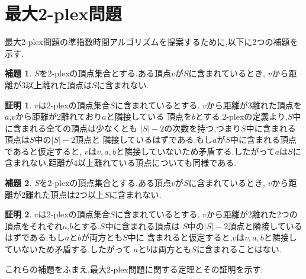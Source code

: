 \documentclass{thesis}
\theoremstyle{definition}
\newtheorem{lemma}{補題}[chapter]
\newtheorem*{prf*}{証明}
\begin{document}
\section{最大2-plex問題} \label{section:2plex}
最大2-plex問題の準指数時間アルゴリズムを提案するために,以下に2つの補題を示す.
\begin{lemma} \label{lemma:1}
$S$を2-plexの頂点集合とする.ある頂点$v$が$S$に含まれているとき,
$v$から距離が3以上離れた頂点は$S$に含まれない.
\begin{prf*}
$v$は2-plexの頂点集合$S$に含まれているとする.
$v$から距離が3離れた頂点を$a$,$v$から距離が2離れており$a$と隣接している
頂点を$b$とする.2-plexの定義より,$S$中に含まれる全ての頂点は少なくとも
$|S| - 2$の次数を持つ,つまり$S$中に含まれる頂点は$S$中の$|S| - 2$頂点と
隣接しているはずである.もし$a$が$S$中に含まれる頂点であると仮定すると,
$v$は$v, a, b$と隣接していないため矛盾する.したがって$a$は$S$に
含まれない.距離が4以上離れている頂点についても同様である.
\end{prf*}
\end{lemma}
\begin{lemma} \label{lemma:2}
$S$を2-plexの頂点集合とする.ある頂点$v$が$S$に含まれているとき,
$v$から距離が2離れた頂点は2つ以上$S$に含まれない.
\begin{prf*}
$v$は2-plexの頂点集合$S$に含まれているとする.
$v$から距離が2離れた2つの頂点をそれぞれ$a$,$b$とする.$S$中に含まれる頂点は
$S$中の$|S| - 2$頂点と隣接しているはずである.もし$a$と$b$が両方とも$S$中に
含まれると仮定すると,$v$は$v, a, b$と隣接していないため矛盾する.したがって
$a$と$b$は両方とも$S$に含まれることはない.
\end{prf*}
\end{lemma}
これらの補題をふまえ,最大2-plex問題に関する定理とその証明を示す.
\end{document}
